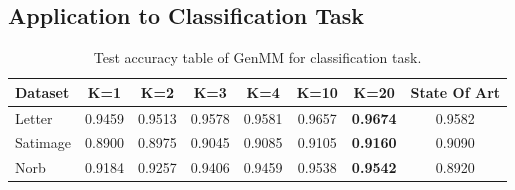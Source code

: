 \subsection{Application to Classification Task}
\begin{table}[!t]
  \caption{Test accuracy table of GenMM for classification task.}\label{tab:acc-classification}
  \begin{tabular}{lccccccc} \toprule
    {Dataset} &  K=1 &  K=2 &  K=3 &  K=4 & K=10 & K=20 & State Of Art \\ \midrule
    Letter & 0.9459 &  0.9513 & 0.9578  & 0.9581 & 0.9657 & \textbf{0.9674} & {0.9582} \cite{tang2016extreme} \\ \midrule
    Satimage & 0.8900 & 0.8975 & 0.9045 & 0.9085 & 0.9105 & \textbf{0.9160} & 0.9090 \cite{jiang2013k-svd}   \\ \midrule
    Norb & 0.9184 & 0.9257 & 0.9406 & 0.9459 & 0.9538 & \textbf{0.9542} & 0.8920 \cite{pmlr-v5-salakhutdinov09a}  \\
    \bottomrule
  \end{tabular}
\end{table}

